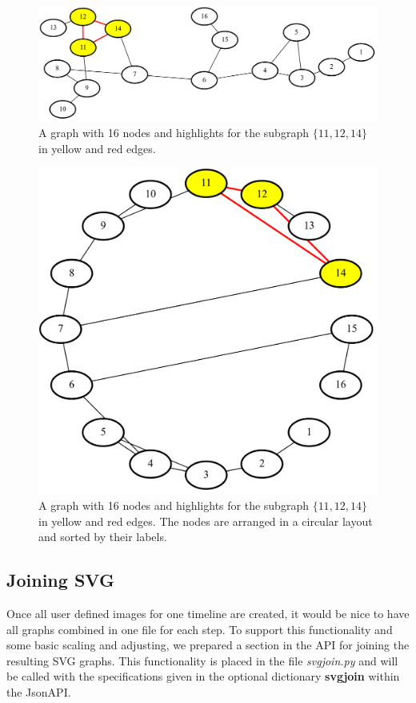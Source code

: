 \documentclass[a4paper, 12pt, bibliography=totoc]{scrartcl}
\begin{document}
\begin{figure}[H]
	\includegraphics[width=\linewidth]{images/minvc16graph9.png}
	\caption{A graph with 16 nodes and highlights for the subgraph $\{11,12,14\}$ in yellow and red edges.}
	\label{fig:minvc16graph9}
\end{figure}

\begin{figure}[H]
	\centering
	\includegraphics[width=0.6\linewidth]{images/minvc16graph9sorted.png}
	\caption{A graph with 16 nodes and highlights for the subgraph $\{11,12,14\}$ in yellow and red edges. The nodes are arranged in a circular layout and sorted by their labels.}
	\label{fig:minvc16graph9sorted}
\end{figure}

\subsection{Joining SVG}\label{sec:svgjoin}
Once all user defined images for one timeline are created, it would be nice to have all graphs combined in one file for each step.
To support this functionality and some basic scaling and adjusting, we prepared a section in the API for joining the resulting SVG graphs. 
This functionality is placed in the file \textit{svgjoin.py} and will be called with the specifications given in the optional dictionary \textbf{svgjoin} within the JsonAPI.
\end{document}
